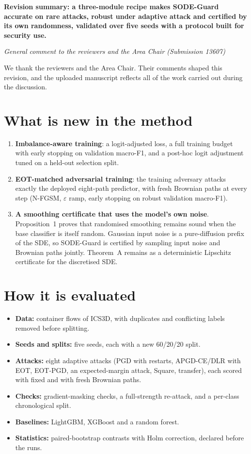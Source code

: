 \documentclass[11pt]{article}
\begin{document}
{\large\bfseries Revision summary: a three-module recipe makes SODE-Guard
accurate on rare attacks, robust under adaptive attack and certified by its own
randomness, validated over five seeds with a protocol built for security use.}

\smallskip
\textit{General comment to the reviewers and the Area Chair (Submission 13607)}

We thank the reviewers and the Area Chair. Their comments shaped this revision,
and the uploaded manuscript reflects all of the work carried out during the
discussion.

\section*{What is new in the method}
\begin{enumerate}
\item \textbf{Imbalance-aware training}: a logit-adjusted loss, a full training
budget with early stopping on validation macro-F1, and a post-hoc logit
adjustment tuned on a held-out selection split.
\item \textbf{EOT-matched adversarial training}: the training adversary attacks
exactly the deployed eight-path predictor, with fresh Brownian paths at every
step (N-FGSM, $\varepsilon$ ramp, early stopping on robust validation macro-F1).
\item \textbf{A smoothing certificate that uses the model's own noise}.
Proposition~1 proves that randomised smoothing remains sound when the base
classifier is itself random. Gaussian input noise is a pure-diffusion prefix of
the SDE, so SODE-Guard is certified by sampling input noise and Brownian paths
jointly. Theorem~A remains as a deterministic Lipschitz certificate for the
discretised SDE.
\end{enumerate}

\section*{How it is evaluated}
\begin{itemize}
\item \textbf{Data:} container flows of ICS3D, with duplicates and conflicting
labels removed before splitting.
\item \textbf{Seeds and splits:} five seeds, each with a new 60/20/20 split.
\item \textbf{Attacks:} eight adaptive attacks (PGD with restarts,
APGD-CE/DLR with EOT, EOT-PGD, an expected-margin attack, Square, transfer),
each scored with fixed and with fresh Brownian paths.
\item \textbf{Checks:} gradient-masking checks, a full-strength re-attack, and a
per-class chronological split.
\item \textbf{Baselines:} LightGBM, XGBoost and a random forest.
\item \textbf{Statistics:} paired-bootstrap contrasts with Holm correction,
declared before the runs.
\end{itemize}
\end{document}
